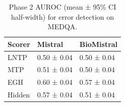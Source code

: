 \begin{table}
\caption{Phase 2 AUROC (mean ± 95\% CI half-width) for error detection on MEDQA.}
\label{tab:phase2_auroc_medqa}
\begin{tabular}{lll}
\toprule
Scorer & Mistral & BioMistral \\
\midrule
LNTP & 0.50 ± 0.04 & 0.50 ± 0.04 \\
MTP & 0.51 ± 0.04 & 0.50 ± 0.04 \\
EGH & 0.60 ± 0.04 & 0.57 ± 0.04 \\
Hidden & 0.57 ± 0.04 & 0.51 ± 0.04 \\
\bottomrule
\end{tabular}
\end{table}
